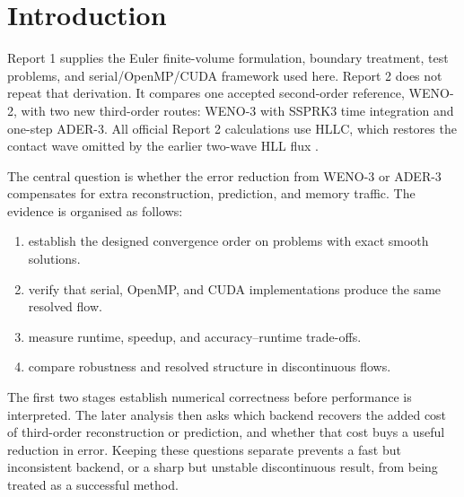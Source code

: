 \chapter{Introduction}
\label{chap:introduction}

 Report 1 supplies the Euler finite-volume formulation, boundary treatment, test problems, and serial/OpenMP/CUDA framework used here. Report 2 does not repeat that derivation. It compares one accepted second-order reference, WENO-2, with two new third-order routes: WENO-3 with SSPRK3 time integration and one-step ADER-3. All official Report 2 calculations use HLLC, which restores the contact wave omitted by the earlier two-wave HLL flux \cite{harten1983,toro1994,toro2009}.

The central question is whether the error reduction from WENO-3 or ADER-3 compensates for extra reconstruction, prediction, and memory traffic. The evidence is organised as follows:
\begin{enumerate}[label=\textbf{Stage \Alph*:},leftmargin=2.4cm]
    \item establish the designed convergence order on problems with exact smooth solutions.
    \item verify that serial, OpenMP, and CUDA implementations produce the same resolved flow.
    \item measure runtime, speedup, and accuracy--runtime trade-offs.
    \item compare robustness and resolved structure in discontinuous flows.
\end{enumerate}
The first two stages establish numerical correctness before performance is interpreted. The later analysis then asks which backend recovers the added cost of third-order reconstruction or prediction, and whether that cost buys a useful reduction in error. Keeping these questions separate prevents a fast but inconsistent backend, or a sharp but unstable discontinuous result, from being treated as a successful method.
